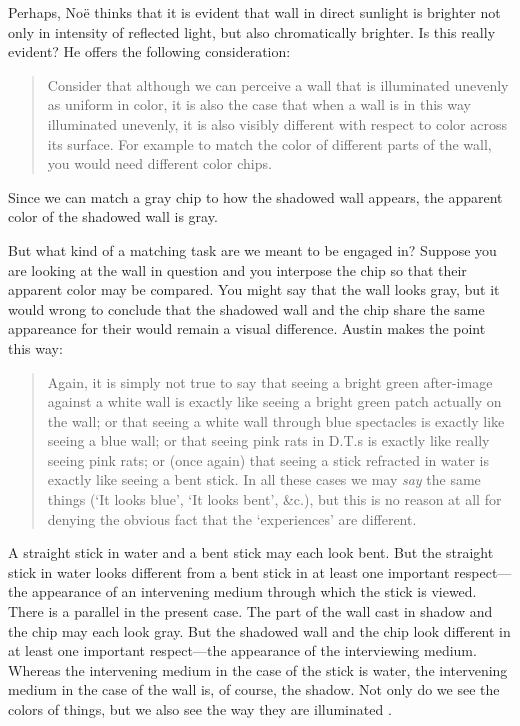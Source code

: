 \documentclass[12pt]{article}
\begin{document}
Perhaps, Noë thinks that it is evident that wall in direct sunlight is brighter not only in intensity of reflected light, but also chromatically brighter. Is this really evident? He offers the following consideration:
	\begin{quote}
		Consider that although we can perceive a wall that is illuminated unevenly as uniform in color, it is also the case that when a wall is in this way illuminated unevenly, it is also visibly different with respect to color across its surface. For example to match the color of different parts of the wall, you would need different color chips. \citep[128]{Noe:2004fk}
	\end{quote}
Since we can match a gray chip to how the shadowed wall appears, the apparent color of the shadowed wall is gray. 

But what kind of a matching task are we meant to be engaged in? Suppose you are looking at the wall in question and you interpose the chip so that their apparent color may be compared. You might say that the wall looks gray, but it would wrong to conclude that the shadowed wall and the chip share the same appareance for their would remain a visual difference. Austin makes the point this way:
	\begin{quote}
		Again, it is simply not true to say that seeing a bright green after-image against a white wall is exactly like seeing a bright green patch actually on the wall; or that seeing a white wall through blue spectacles is exactly like seeing a blue wall; or that seeing pink rats in D.T.s is exactly like really seeing pink rats; or (once again) that seeing a stick refracted in water is exactly like seeing a bent stick. In all these cases we may \emph{say} the same things (`It looks blue', `It looks bent', \&c.), but this is no reason at all for denying the obvious fact that the `experiences' are different. \citep[49]{Austin:1962lr}
	\end{quote}

A straight stick in water and a bent stick may each look bent. But the straight stick in water looks different from a bent stick in at least one important respect---the appearance of an intervening medium through which the stick is viewed. There is a parallel in the present case. The part of the wall cast in shadow and the chip may each look gray. But the shadowed wall and the chip look different in at least one important respect---the appearance of the interviewing medium. Whereas the intervening medium in the case of the stick is water, the intervening medium in the case of the wall is, of course, the shadow. Not only do we see the colors of things, but we also see the way they are illuminated \citep[see][]{Hilbert:2007qy}.
\end{document}
